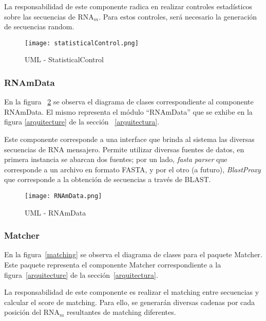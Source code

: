 \par La responsabilidad de este componente radica en realizar controles estadísticos sobre las secuencias de RNA$_m$. Para estos controles, será necesario la generación de secuencias random.	

\begin{figure}[!hbtp]
	\begin{center}
		\texttt{[image: statisticalControl.png]}
		\caption{UML - StatisticalControl}
		\label{statisticalControl}
	\end{center}
\end{figure}

\subsubsection{RNAmData}
\par En la figura ~\ref{RNAmData} se observa el diagrama de clases correspondiente al componente \textsf{RNAmData}. El mismo representa el módulo ``RNAmData'' que se exhibe en la figura \ref{arquitecture} de la sección ~\ref{arquitectura}.

\par Este componente corresponde a una interface que brinda al sistema las diversas secuencias de RNA mensajero. Permite utilizar diversas fuentes de datos, en primera instancia se abarcan dos fuentes; por un lado, \emph{fasta parser} que corresponde a un archivo en formato FASTA, y por el otro (a futuro), \emph{BlastProxy} que corresponde a la obtención de secuencias a través de BLAST.	

\begin{figure}[!hbtp]
	\begin{center}
		\texttt{[image: RNAmData.png]}
		\caption{UML - RNAmData}
		\label{RNAmData}
	\end{center}
\end{figure}

\subsubsection{Matcher}
\par En la figura~\ref{matching} se observa el diagrama de clases para el paquete \textsf{Matcher}. Este paquete representa el componente \textsf{Matcher} correspondiente a la figura~\ref{arquitecture} de la sección~\ref{arquitectura}.
\par La responsabilidad de este componente es realizar el matching entre secuencias y calcular el score de matching. Para ello, se generarán diversas cadenas por cada posición del RNA$_m$ resultantes de matching diferentes. 

